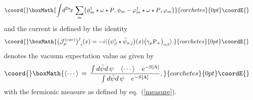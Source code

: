 \documentclass[a4paper,12pt]{article}
\def\cJ{{\cal J}}
\def\A{{\rm A}}
\def\idxn{\int\! d^{2n}\!x \,}
\begin{document}
\begin{displaymath}\coord{}\boxMath{
\idxn\sum_m\{\phi^{\dagger}_m
\star\omega\star P_{-}\phi_m-
\varphi^{\dagger}_m\star\omega\star P_{+}\varphi_m\}
}{corchetes}{0pt}\coordE{}\end{displaymath}
and the current \myHighlight{$\cJ_\mu^{(cov)}$}\coordHE{} is defined by the identity 
\begin{displaymath}\coord{}\boxMath{
\big(\cJ_\mu^{(cov)}\big)^{j}_{\;\,i}(x)=
-i\langle \big(\psi^i_{\beta}\star\bar{\psi}_{\alpha\,j}\big)(x)
\big(\gamma_{\mu}{\rm P}_{+}\big)_{\alpha\beta}\rangle.
}{corchetes}{0pt}\coordE{}\end{displaymath}
\myHighlight{$\langle\cdots \rangle$}\coordHE{} denotes the vacuum expectation value as given by 
\begin{displaymath}\coord{}\boxMath{
\langle\cdots \rangle\,=\,
\frac{\int  d\bar{\psi}d\,\psi\quad\langle\cdots \rangle\quad e^{-{\rm S}[\A]}}
{\int  d\bar{\psi}d\,\psi\quad  e^{-{\rm S}[\A]}},
}{corchetes}{0pt}\coordE{}\end{displaymath}
with the fermionic measure \coordHE{} as defined by 
eq.~(\ref{measure}).
\end{document}
